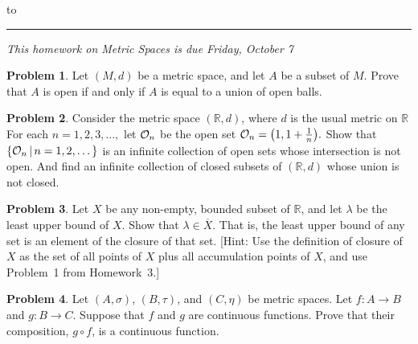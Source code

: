 \documentclass[12pt]{article}
\newcommand{\R}{{\mathbb R}}
\theoremstyle{definition}
\newtheorem{problem}{Problem}
\newenvironment{answer}{\par\medskip\bgroup\color{darkblue}}{\egroup\medskip}
\begin{document}
\hbox to 
\nointerlineskip
\vskip 2pt
\hrule height 1pt

\medskip

\centerline{\textit{This homework on Metric Spaces is due Friday, October 7}}

\bigskip

\def\ds{\displaystyle}


\begin{problem}  %
Let $(M,d)$ be a metric space, and let $A$ be a subset of $M$.  Prove that $A$ is open
if and only if $A$ is equal to a union of open balls.
\end{problem}

\begin{answer}
\end{answer}


\begin{problem}  %
Consider the metric space $(\R,d)$, where $d$ is the usual metric on $\R$  For each $n=1,2,3,\dots,$ let ${\cal O}_n$ be 
the open set ${\cal O}_n=\big(1,1+\frac{1}{n}\big).$
Show that $\{{\cal O}_n\,|\,n=1,2,\dots\}$ is an infinite collection of open
sets whose intersection is not open.
And find an infinite collection of closed subsets of $(\R,d)$ whose union is not closed.
\end{problem}

\begin{answer}
\end{answer}


\begin{problem}  %
Let $X$ be any non-empty, bounded subset of $\R$, and let $\lambda$ be the least upper bound
of $X$.  Show that $\lambda\in\overline{X}$.  That is, the least upper bound of any set is an
element of the closure of that set.  [Hint:  Use the definition of closure of $X$ as the set of all
points of $X$ plus all accumulation points of $X$, and use Problem~1 from Homework~3.]
\end{problem}

\begin{answer}
\end{answer}



\begin{problem}  %
Let $(A,\sigma)$, $(B,\tau)$, and $(C,\eta)$ be metric spaces.  Let $f\colon A\to B$ and $g\colon B\to C$.
Suppose that $f$ and $g$ are continuous functions.  Prove that their composition, $g\circ f$, is a continuous
function.
\end{problem}
\end{document}
